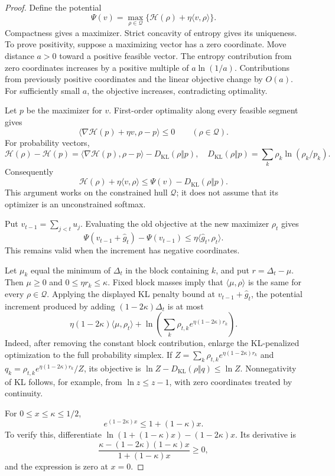 \documentclass[11pt]{article}
\theoremstyle{definition}
\newcommand{\1}{\mathbf 1}
\newcommand{\HH}{\mathcal H}
\newcommand{\QQ}{\mathcal Q}
\newcommand{\KL}{D_{\mathrm{KL}}}
\newcommand{\ip}[2]{\langle #1,#2\rangle}
\begin{document}
\begin{proof}
Define the potential
\[
 \Psi(v)=\max_{\rho\in\QQ}\{\HH(\rho)+\eta\ip v\rho\}.
\]
Compactness gives a maximizer. Strict concavity of entropy gives its
uniqueness. To prove positivity, suppose a maximizing vector has a zero
coordinate. Move distance $a>0$ toward a positive feasible vector.
The entropy contribution from zero coordinates increases by a positive
multiple of $a\ln(1/a)$. Contributions from previously positive
coordinates and the linear objective change by $O(a)$.
For sufficiently small $a$, the objective increases, contradicting
optimality.

Let $p$ be the maximizer for $v$. First-order optimality along every
feasible segment gives
\[
 \ip{\nabla\HH(p)+\eta v}{\rho-p}\le0
 \qquad(\rho\in\QQ).
\]
For probability vectors,
\[
 \HH(\rho)-\HH(p)
 =\ip{\nabla\HH(p)}{\rho-p}-\KL(\rho\Vert p),
 \quad
 \KL(\rho\Vert p)=\sum_k\rho_k\ln(\rho_k/p_k).
\]
Consequently
\[
 \HH(\rho)+\eta\ip v\rho
 \le\Psi(v)-\KL(\rho\Vert p).
\]
This argument works on the constrained hull $\QQ$; it does not assume
that its optimizer is an unconstrained softmax.

Put $v_{t-1}=\sum_{j<t}u_j$. Evaluating the old objective at the new
maximizer $\rho_t$ gives
\[
 \Psi(v_{t-1}+\widehat g_t)-\Psi(v_{t-1})
 \le\eta\ip{\widehat g_t}{\rho_t}.
\]
This remains valid when the increment has negative coordinates.

Let $\mu_k$ equal the minimum of $\Delta_t$ in the block containing $k$,
and put $r=\Delta_t-\mu$. Then $\mu\ge0$ and
$0\le\eta r_k\le\kappa$. Fixed block masses imply that
$\ip\mu\rho$ is the same for every $\rho\in\QQ$.
Applying the displayed KL penalty bound at $v_{t-1}+\widehat g_t$, the potential
increment produced by adding $(1-2\kappa)\Delta_t$ is at most
\[
 \eta(1-2\kappa)\ip\mu{\rho_t}
 +\ln\!\left(\sum_k\rho_{t,k}e^{\eta(1-2\kappa)r_k}\right).
\]
Indeed, after removing the constant block contribution, enlarge the
KL-penalized optimization to the full probability simplex. If
$Z=\sum_k\rho_{t,k}e^{\eta(1-2\kappa)r_k}$ and
$q_k=\rho_{t,k}e^{\eta(1-2\kappa)r_k}/Z$, its objective is
$\ln Z-\KL(\rho\Vert q)\le\ln Z$.
Nonnegativity of KL follows, for example, from $\ln z\le z-1$,
with zero coordinates treated by continuity.

For $0\le x\le\kappa\le1/2$,
\[
 e^{(1-2\kappa)x}\le1+(1-\kappa)x.
\]
To verify this, differentiate
$\ln(1+(1-\kappa)x)-(1-2\kappa)x$. Its derivative is
\[
 \frac{\kappa-(1-2\kappa)(1-\kappa)x}
 {1+(1-\kappa)x}\ge0,
\]
and the expression is zero at $x=0$.


\end{proof}
\end{document}

